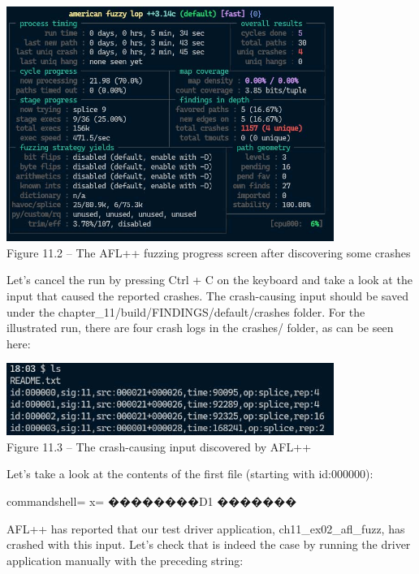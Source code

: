 \begin{center}
\includegraphics[width=0.8\textwidth]{content/2/chapter11/images/2.jpg}\\
Figure 11.2 – The AFL++ fuzzing progress screen after discovering some crashes
\end{center}

Let's cancel the run by pressing Ctrl + C on the keyboard and take a look at the input that caused the reported crashes. The crash-causing input should be saved under the chapter\_11/build/FINDINGS/default/crashes folder. For the illustrated run, there are four crash logs in the crashes/ folder, as can be seen here:

\begin{center}
\includegraphics[width=0.8\textwidth]{content/2/chapter11/images/3.jpg}\\
Figure 11.3 – The crash-causing input discovered by AFL++
\end{center}

Let's take a look at the contents of the first file (starting with id:000000):

\begin{tcblisting}{commandshell={}}
x=%
��������D1%
�������%
\end{tcblisting}

AFL++ has reported that our test driver application, ch11\_ex02\_afl\_fuzz, has crashed with this input. Let's check that is indeed the case by running the driver application manually with the preceding string:

